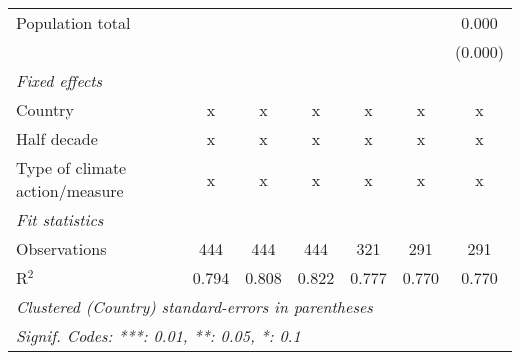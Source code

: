 \begin{tabular}{lcccccc}
   Population total                                     &              &                &                &                &                & 0.000\\   
                                                        &              &                &                &                &                & (0.000)\\   
   \emph{Fixed effects}\\
   Country                                              & x            & x              & x              & x              & x              & x\\  
   Half decade                                          & x            & x              & x              & x              & x              & x\\  
   Type of climate action/measure                       & x            & x              & x              & x              & x              & x\\  
   \midrule \emph{Fit statistics}\\
   Observations                                         & 444          & 444            & 444            & 321            & 291            & 291\\  
   R$^2$                                                & 0.794        & 0.808          & 0.822          & 0.777          & 0.770          & 0.770\\  
   \midrule
   \multicolumn{7}{l}{\emph{Clustered (Country) standard-errors in parentheses}}\\
   \multicolumn{7}{l}{\emph{Signif. Codes: ***: 0.01, **: 0.05, *: 0.1}}\\
\end{tabular}
\par\endgroup


